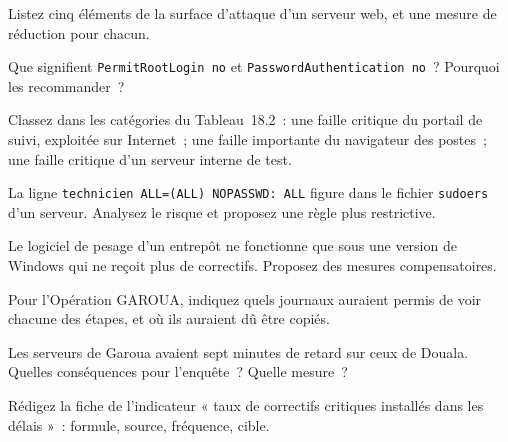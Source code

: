 \bigskip

\begin{boxexo}[title={\ding{45}\quad Exercice~18.1. Surface d'attaque \niveaubase}]
Listez cinq éléments de la surface d'attaque d'un serveur web, et une
mesure de réduction pour chacun.
\end{boxexo}

\begin{boxexo}[title={\ding{45}\quad Exercice~18.2. SSH \niveaubase}]
Que signifient \texttt{PermitRootLogin no} et
\texttt{PasswordAuthentication no}~? Pourquoi les recommander~?
\end{boxexo}

\begin{boxexo}[title={\ding{45}\quad Exercice~18.3. Les délais \niveaubase}]
Classez dans les catégories du Tableau~18.2~: une faille critique du
portail de suivi, exploitée sur Internet~; une faille importante du
navigateur des postes~; une faille critique d'un serveur interne de test.
\end{boxexo}

\begin{boxexo}[title={\ding{45}\quad Exercice~18.4. sudoers \niveaumoyen}]
La ligne \texttt{technicien ALL=(ALL) NOPASSWD: ALL} figure dans le
fichier \texttt{sudoers} d'un serveur. Analysez le risque et proposez une
règle plus restrictive.
\end{boxexo}

\begin{boxexo}[title={\ding{45}\quad Exercice~18.5. Compenser \niveaumoyen}]
Le logiciel de pesage d'un entrepôt ne fonctionne que sous une version de
Windows qui ne reçoit plus de correctifs. Proposez des mesures
compensatoires.
\end{boxexo}

\begin{boxexo}[title={\ding{45}\quad Exercice~18.6. Les journaux \niveaumoyen}]
Pour l'Opération GAROUA, indiquez quels journaux auraient permis de voir
chacune des étapes, et où ils auraient dû être copiés.
\end{boxexo}

\begin{boxexo}[title={\ding{45}\quad Exercice~18.7. Horloges \niveaumoyen}]
Les serveurs de Garoua avaient sept minutes de retard sur ceux de Douala.
Quelles conséquences pour l'enquête~? Quelle mesure~?
\end{boxexo}

\begin{boxexo}[title={\ding{45}\quad Exercice~18.8. Mesurer \niveaumoyen}]
Rédigez la fiche de l'indicateur « taux de correctifs critiques installés
dans les délais »~: formule, source, fréquence, cible.
\end{boxexo}

